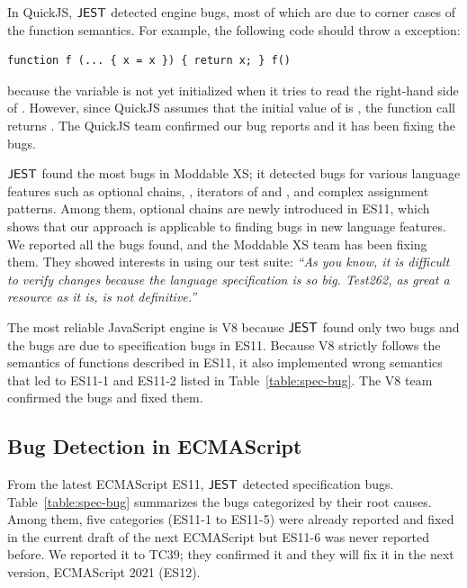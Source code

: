 In QuickJS, $\tool$ detected  engine bugs, most of which are due to corner cases of
the function semantics.  For example, the following code should throw
a  exception:
\begin{lstlisting}[style=myJSstyle]
    function f (... { x = x }) { return x; } f()
\end{lstlisting}
because the variable  is not yet initialized when it tries to
read the right-hand side of .
However, since QuickJS assumes that the initial value of  is
, the function call  returns .
The QuickJS team confirmed our bug reports and it has been fixing the bugs.

$\tool$ found the most bugs in Moddable XS; it detected  bugs for various
language features such as optional chains, ,
iterators of  and , and complex assignment patterns.
Among them, optional chains are newly introduced in ES11, which shows that
our approach is applicable to finding bugs in new language features.
We reported all the bugs found, and the Moddable XS team has been
fixing them.  They showed interests in using our test suite:
\emph{``As you know, it is difficult to verify changes because the language specification
is so big. Test262, as great a resource as it is, is not definitive.''}

The most reliable JavaScript engine is V8 because $\tool$ found only two bugs and
the bugs are due to specification bugs in ES11.  Because V8 strictly follows the
semantics of functions described in ES11, it also implemented wrong semantics
that led to ES11-1 and ES11-2 listed in Table~\ref{table:spec-bug}.
The V8 team confirmed the bugs and fixed them.

\subsection{Bug Detection in ECMAScript}
From the latest ECMAScript ES11, $\tool$ detected  specification bugs.
Table~\ref{table:spec-bug} summarizes the bugs categorized by their root causes.
Among them, five categories (ES11-1 to ES11-5) were already reported and fixed in the current
draft of the next ECMAScript but ES11-6 was never reported before.
We reported it to TC39; they confirmed it and they will
fix it in the next version, ECMAScript 2021 (ES12).

